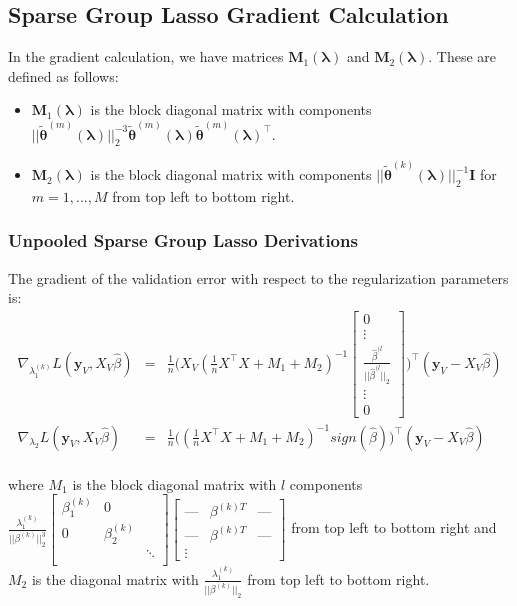 \documentclass[10pt,letterpaper]{article}
\begin{document}
\subsection{Sparse Group Lasso Gradient Calculation}
In the gradient calculation, we have matrices $\boldsymbol{M}_1(\boldsymbol\lambda)$ and $\boldsymbol{M}_2(\boldsymbol\lambda)$. These are defined as follows:
\begin{itemize}
\item
$\boldsymbol{M}_1(\boldsymbol\lambda)$ is the block diagonal matrix with  components 
$
|| \tilde{\boldsymbol{\theta}}^{(m)}(\boldsymbol{\lambda})||_2^{-3} \tilde{\boldsymbol{\theta}}^{(m)}(\boldsymbol{\lambda}) \tilde{\boldsymbol{\theta}}^{(m)}(\boldsymbol{\lambda})^\top
$.
\item
$\boldsymbol{M}_2(\boldsymbol\lambda)$ is the block diagonal matrix with components
$||\tilde{\boldsymbol{\theta}}^{(k)}(\boldsymbol{\lambda})||_2^{-1} \boldsymbol{I}$
for $m = 1, ..., M$ 
from top left to bottom right.
\end{itemize}

\subsubsection{Unpooled Sparse Group Lasso Derivations}
The gradient of the validation error with respect to the regularization parameters is:
\begin{equation}
\begin{array}{lcl}
\nabla_{\lambda_1^{(k)}} L(\boldsymbol y_V, X_V \hat \beta) &=& 
\frac{1}{n}
\Bigg (
X_V
(\frac{1}{n} X^\top X + M_1 + M_2)^{-1}
\begin{bmatrix}
0 \\
\vdots \\
\frac{\hat\beta^{(l}}{||\hat\beta^{(l}||_2}\\
\vdots\\
0
\end{bmatrix}
\Bigg )^\top
(\boldsymbol y_V - X_V \hat \beta)
 \\
\nabla_{\lambda_2} L(\boldsymbol y_V, X_V \hat \beta) &=&
\frac{1}{n}
\Bigg (
(\frac{1}{n} X^\top X + M_1 + M_2)^{-1} sign(\hat \beta)
\Bigg )^\top
(\boldsymbol y_V - X_V \hat \beta)
\\ 
\end{array}
\end{equation}

where $M_1$ is the block diagonal matrix with $l$ components 
$
\frac{\lambda_1^{(k)}}{|| \beta^{(k)}||_2^3}
\begin{bmatrix} 
\beta_1^{(k)} & 0 & \\
0 & \beta_2^{(k)} &  \\
 &  & \ddots \\
\end{bmatrix}
\begin{bmatrix}
\text{---} & \beta^{(k)T} & \text{---} \\
\text{---} & \beta^{(k)T} & \text{---} \\
\vdots
\end{bmatrix}
$ from top left to bottom right and $M_2$ is the diagonal matrix with $\frac{\lambda_1^{(k)}}{|| \beta^{(k)}||_2}$ from top left to bottom right.
\end{document}
